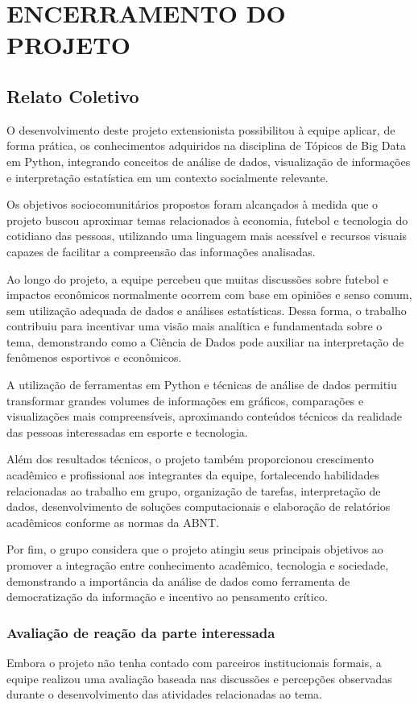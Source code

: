\documentclass[12pt, a4paper, brazil]{article}
\begin{document}
\section{ENCERRAMENTO DO PROJETO}
\subsection{Relato Coletivo}
O desenvolvimento deste projeto extensionista possibilitou à equipe aplicar, de forma prática, os conhecimentos adquiridos na disciplina de Tópicos de Big Data em Python, integrando conceitos de análise de dados, visualização de informações e interpretação estatística em um contexto socialmente relevante.

Os objetivos sociocomunitários propostos foram alcançados à medida que o projeto buscou aproximar temas relacionados à economia, futebol e tecnologia do cotidiano das pessoas, utilizando uma linguagem mais acessível e recursos visuais capazes de facilitar a compreensão das informações analisadas.

Ao longo do projeto, a equipe percebeu que muitas discussões sobre futebol e impactos econômicos normalmente ocorrem com base em opiniões e senso comum, sem utilização adequada de dados e análises estatísticas. Dessa forma, o trabalho contribuiu para incentivar uma visão mais analítica e fundamentada sobre o tema, demonstrando como a Ciência de Dados pode auxiliar na interpretação de fenômenos esportivos e econômicos.

A utilização de ferramentas em Python e técnicas de análise de dados permitiu transformar grandes volumes de informações em gráficos, comparações e visualizações mais compreensíveis, aproximando conteúdos técnicos da realidade das pessoas interessadas em esporte e tecnologia.

Além dos resultados técnicos, o projeto também proporcionou crescimento acadêmico e profissional aos integrantes da equipe, fortalecendo habilidades relacionadas ao trabalho em grupo, organização de tarefas, interpretação de dados, desenvolvimento de soluções computacionais e elaboração de relatórios acadêmicos conforme as normas da ABNT.

Por fim, o grupo considera que o projeto atingiu seus principais objetivos ao promover a integração entre conhecimento acadêmico, tecnologia e sociedade, demonstrando a importância da análise de dados como ferramenta de democratização da informação e incentivo ao pensamento crítico.

\subsubsection{Avaliação de reação da parte interessada}
Embora o projeto não tenha contado com parceiros institucionais formais, a equipe realizou uma avaliação baseada nas discussões e percepções observadas durante o desenvolvimento das atividades relacionadas ao tema.
\end{document}

